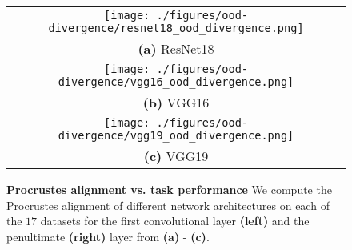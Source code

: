 \begin{figure}[h!]
    \centering
    \begin{tabular}{c}
        \texttt{[image: ./figures/ood-divergence/resnet18\_ood\_divergence.png]}\\   
        \textbf{(a)} ResNet18\\
        \texttt{[image: ./figures/ood-divergence/vgg16\_ood\_divergence.png]} \\
        \textbf{(b)} VGG16 \\
        \texttt{[image: ./figures/ood-divergence/vgg19\_ood\_divergence.png]} \\
        \textbf{(c)} VGG19
    \end{tabular}
    \caption{\textbf{Procrustes alignment vs. task
performance} We compute the Procrustes alignment of different network architectures on each of the $17$ datasets for the first convolutional layer \textbf{(left)} and the penultimate \textbf{(right)} layer from \textbf{(a)} - \textbf{(c)}.}
    \label{fig:ood-convergence-appendix}
\end{figure}
